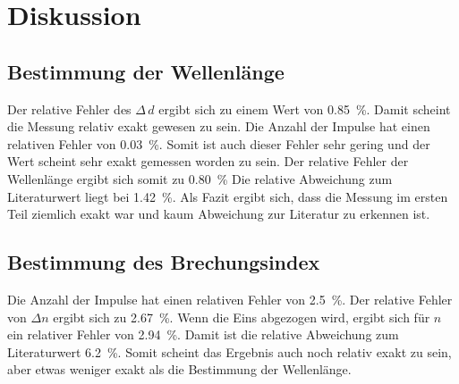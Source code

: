 \section{Diskussion}
\label{sec:Diskussion}

\subsection{Bestimmung der Wellenlänge}
Der relative Fehler des $\Delta \, d$ ergibt sich zu einem Wert von \SI{0.85}{\percent}. Damit scheint die Messung relativ exakt gewesen zu sein.  
Die Anzahl der Impulse hat einen relativen Fehler von \SI{0.03}{\percent}. Somit ist auch dieser Fehler sehr gering und der Wert scheint sehr exakt gemessen worden zu sein.  
Der relative Fehler der Wellenlänge ergibt sich somit zu \SI{0.80}{\percent} 
Die relative Abweichung zum Literaturwert liegt bei 
\SI{1.42}{\percent}.
Als Fazit ergibt sich, dass die Messung im ersten Teil ziemlich exakt war und kaum Abweichung zur Literatur zu erkennen ist. 

\subsection{Bestimmung des Brechungsindex}
Die Anzahl der Impulse hat einen relativen Fehler von \SI{2.5}{\percent}. 
Der relative Fehler von $\Delta n$ ergibt sich zu \SI{2.67}{\percent}.
Wenn die Eins abgezogen wird, ergibt sich für $n$ ein relativer Fehler von \SI{2.94}{\percent}. Damit ist die relative Abweichung zum Literaturwert \SI{6.2}{\percent}. Somit scheint das Ergebnis auch noch relativ exakt zu sein, aber etwas weniger exakt als die Bestimmung der Wellenlänge. 
